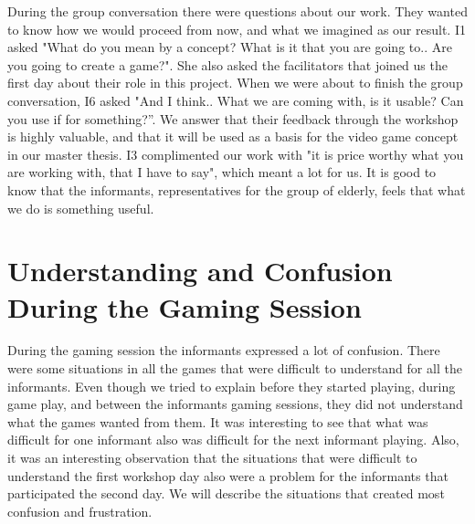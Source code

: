 During the group conversation there were questions about our work. They wanted to know how we would proceed from now, and what we imagined as our result. I1 asked "What do you mean by a concept? What is it that you are going to.. Are you going to create a game?". She also asked the facilitators that joined us the first day about their role in this project. When we were about to finish the group conversation, I6 asked "And I think.. What we are coming with, is it usable? Can you use if for something?”. We answer that their feedback through the workshop is highly valuable, and that it will be used as a basis for the video game concept in our master thesis. I3 complimented our work with "it is price worthy what you are working with, that I have to say", which meant a lot for us. It is good to know that the informants, representatives for the group of elderly, feels that what we do is something useful.  


\section{Understanding and Confusion During the Gaming Session}
During the gaming session the informants expressed a lot of confusion. There were some situations in all the games that were difficult to understand for all the informants. Even though we tried to explain before they started playing, during game play, and between the informants gaming sessions, they did not understand what the games wanted from them. It was interesting to see that what was difficult for one informant also was difficult for the next informant playing. Also, it was an interesting observation that the situations that were difficult to understand the first workshop day also were a problem for the informants that participated the second day. We will describe the situations that created most confusion and frustration.

